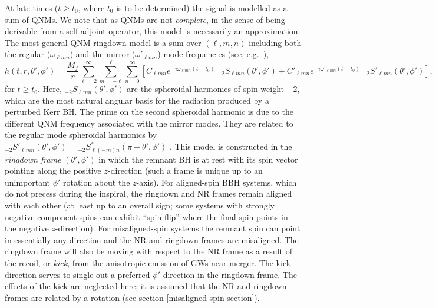 At late times ($t \geq t_0$, where $t_0$ is to be determined) the signal is modelled as a sum of QNMs.
We note that as QNMs are not \emph{complete}, in the sense of being derivable from a self-adjoint operator, this model is necessarily an approximation.
The most general QNM ringdown model is a sum over $(\ell,m,n)$ including both the regular ($\omega_{\ell m n}$) and the mirror ($\omega'_{\ell m n}$) mode frequencies (see, e.g.\ \cite{Berti:2005ys}),
\begin{equation}\label{general_ringdown}
    h(t,r,\theta',\phi') =
    \frac{M_f}{r} \sum_{\ell=2}^{\infty}\sum_{m=-\ell}^{\ell}\sum_{n=0}^{\infty} \left[ C_{\ell m n} e^{-i \omega_{\ell m n}(t-t_0)} ~ {}_{-2}S_{\ell m n}(\theta',\phi') + C'_{\ell m n} e^{-i \omega'_{\ell m n}(t-t_0)} ~ {}_{-2}S'_{\ell m n}(\theta',\phi') \right],
\end{equation}
for $t\geq t_0$.
Here, ${}_{-2}S_{\ell m n}(\theta',\phi')$ are the spheroidal harmonics of spin weight $-2$, which are the most natural angular basis for the radiation produced by a perturbed Kerr BH. 
The prime on the second spheroidal harmonic is due to the different QNM frequency associated with the mirror modes.
They are related to the regular mode spheroidal harmonics by ${}_{-2}S'_{\ell m n}(\theta',\phi') = {}_{-2}S^*_{\ell (-m) n}(\pi-\theta',\phi')$ \cite{Dhani:2020nik}.
This model is constructed in the \emph{ringdown frame} $(\theta', \phi')$ in which the remnant BH is at rest with its spin vector pointing along the positive $z$-direction (such a frame is unique up to an unimportant $\phi'$ rotation about the $z$-axis).
For aligned-spin BBH systems, which do not precess during the inspiral, the ringdown and NR frames remain aligned with each other (at least up to an overall sign; some systems with strongly negative component spins can exhibit ``spin flip'' where the final spin points in the negative $z$-direction).
For misaligned-spin systems the remnant spin can point in essentially any direction and the NR and ringdown frames are misaligned.
The ringdown frame will also be moving with respect to the NR frame as a result of the recoil, or \emph{kick}, from the anisotropic emission of GWs near merger. The kick direction serves to single out a preferred $\phi'$ direction in the ringdown frame.
The effects of the kick are neglected here; it is assumed that the NR and ringdown frames are related by a rotation (see section \ref{misaligned-spin-section}).

